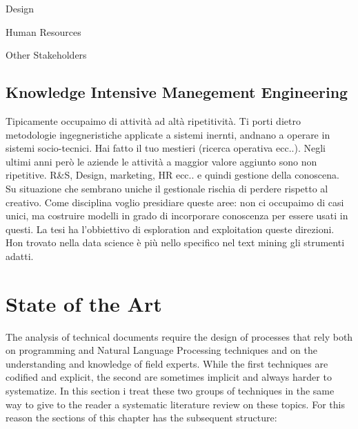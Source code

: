 \documentclass[]{book}
\begin{document}
Design

Human Resources

Other Stakeholders

\section{Knowledge Intensive Manegement
Engineering}\label{knowledge-intensive-manegement-engineering}

Tipicamente occupaimo di attività ad altà ripetitività. Ti porti dietro
metodologie ingegneristiche applicate a sistemi inernti, andnano a
operare in sistemi socio-tecnici. Hai fatto il tuo mestieri (ricerca
operativa ecc..). Negli ultimi anni però le aziende le attività a
maggior valore aggiunto sono non ripetitive. R\&S, Design, marketing, HR
ecc.. e quindi gestione della conoscena. Su situazione che sembrano
uniche il gestionale rischia di perdere rispetto al creativo. Come
disciplina voglio presidiare queste aree: non ci occupaimo di casi
unici, ma costruire modelli in grado di incorporare conoscenza per
essere usati in questi. La tesi ha l'obbiettivo di esploration and
exploitation queste direzioni. Hon trovato nella data science è più
nello specifico nel text mining gli strumenti adatti.

\chapter{State of the Art}\label{sota}

The analysis of technical documents require the design of processes that
rely both on programming and Natural Language Processing techniques and
on the understanding and knowledge of field experts. While the first
techniques are codified and explicit, the second are sometimes implicit
and always harder to systematize. In this section i treat these two
groups of techniques in the same way to give to the reader a systematic
literature review on these topics. For this reason the sections of this
chapter has the subsequent structure:
\end{document}
